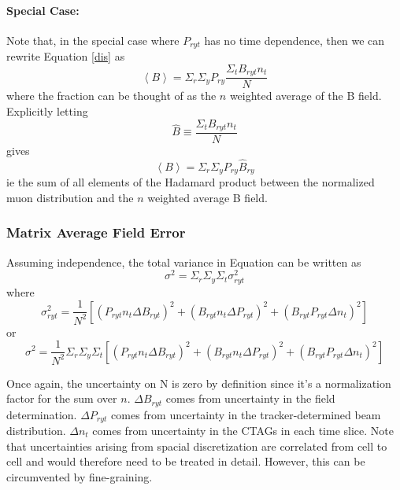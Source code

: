 \documentclass[twoside]{article}
\begin{document}
\paragraph{Special Case:}
Note that, in the special case where $P_{ryt}$ has no time dependence, then we can rewrite Equation \ref{dis} as 
\begin{equation}
\left\langle B \right\rangle =  \Sigma_r \Sigma_y P_{ry} \frac{\Sigma_t B_{ryt} n_t }  {N}
\end{equation}
where the fraction can be thought of as the $n$ weighted average of the B field. Explicitly  letting
\begin{equation}
\hat{B} \equiv \frac{\Sigma_t B_{ryt} n_t }  {N}
\end{equation}
gives
\begin{equation}
\boxed{
\left\langle B \right\rangle =  \Sigma_r \Sigma_y P_{ry} \hat{B}_{ry}
}
\end{equation}
ie the sum of all elements of the Hadamard product between the normalized muon distribution and the $n$ weighted average B field.


\subsubsection{Matrix Average Field Error}
Assuming independence, the total variance in Equation \label{dis} can be written as
\begin{equation}
	\sigma^2 = 
	\Sigma_r \Sigma_y \Sigma_t \sigma^2_{ryt}
\end{equation}
where 
\begin{equation}
 \sigma^2_{ryt} = \frac{1}{N^2} [( P_{ryt} n_t \Delta B_{ryt})^2  + (B_{ryt} n_t\Delta P_{ryt})^2 + (B_{ryt} P_{ryt}\Delta n_{t})^2]
\end{equation}
or 
\begin{equation}
\boxed{
\sigma^2 = 
\frac{1}{N^2} \Sigma_r \Sigma_y \Sigma_t  [( P_{ryt} n_t \Delta B_{ryt})^2  + (B_{ryt} n_t\Delta P_{ryt})^2 + (B_{ryt} P_{ryt}\Delta n_{t})^2]
}
\end{equation}

Once again, the uncertainty on N is zero by definition since it's a normalization factor for the sum over $n$. $\Delta B_{ryt}$ comes from uncertainty in the field determination. $\Delta P_{ryt}$ comes from uncertainty in the tracker-determined beam distribution.  $\Delta n_{t}$ comes from uncertainty in the CTAGs in each time slice. Note that uncertainties arising from spacial discretization are correlated from cell to cell and would therefore need to be treated in detail. However, this can be circumvented by fine-graining. 
\end{document}
